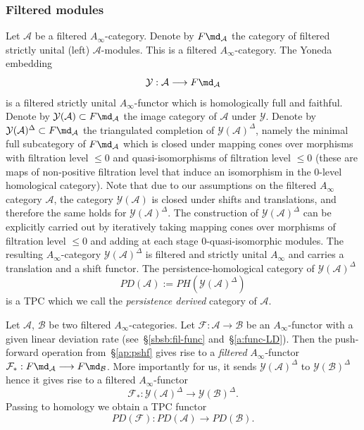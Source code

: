 \subsubsection{Filtered modules} \label{sbsb:fmod} Let
$\mathcal{A}$ be a filtered $A_{\infty}$-category. Denote by $F
\md_{\mathcal{A}}$ the category of filtered strictly unital (left)
$\mathcal{A}$-modules. This is a filtered 
$A_{\infty}$-category. The Yoneda embedding
$$\mathcal{Y}: \mathcal{A} \longrightarrow F\md_{\mathcal{A}}$$
is a filtered strictly unital $A_{\infty}$-functor which is
homologically full and faithful.  Denote by
$\mathcal{Y}(\mathcal{A}) \subset F \md_{\mathcal{A}}$ the image
category of $\mathcal{A}$ under $\mathcal{Y}$. Denote by
$\mathcal{Y}(\mathcal{A})^{\Delta} \subset F \md_{\mathcal{A}}$ the
triangulated completion of $\mathcal{Y}(\mathcal{A})^{\Delta}$,
namely the minimal full subcategory of $F \md_{\mathcal{A}}$ which is
closed under mapping cones over morphisms with filtration level
$\leq 0$ and quasi-isomorphisms of filtration level $\leq 0$
(these are maps of non-positive filtration level that induce an isomorphism in the $0$-level homological category). Note
that due to our assumptions on the filtered $A_{\infty}$ category $\mathcal{A}$, the category
$\mathcal{Y}(\mathcal{A})$ is closed under shifts and translations,
and therefore the same holds for $\mathcal{Y}(\mathcal{A})^{\Delta}$.
The construction of $\mathcal{Y}(\mathcal{A})^{\Delta}$ can be
explicitly carried out by iteratively taking mapping cones over
morphisms of filtration level $\leq 0$ and adding at each stage
$0$-quasi-isomorphic modules. The resulting
$A_{\infty}$-category $\mathcal{Y}(\mathcal{A})^{\Delta}$ is filtered
and strictly unital $A_{\infty}$ and carries a translation and a shift
functor. The persistence-homological category of
$\mathcal{Y}(\mathcal{A})^{\Delta}$
$$PD(\mathcal{A}) := PH(\mathcal{Y}(\mathcal{A})^{\Delta})$$
is a TPC which we call the {\em persistence derived} category of
$\mathcal{A}$.

Let $\mathcal{A}$, $\mathcal{B}$ be two filtered
$A_{\infty}$-categories. Let
  $\mathcal{F}: \mathcal{A} \longrightarrow \mathcal{B}$ be an
  $A_{\infty}$-functor with a given linear deviation rate
  (see~\S\ref{sbsb:fil-func} and~\S\ref{a:func-LD}). Then the
  push-forward operation from~\S\ref{ap:pshf} gives rise to a {\em
    filtered} $A_{\infty}$-functor
  $\mathcal{F}_*: F\md_{\mathcal{A}} \longrightarrow
  F\md_{\mathcal{B}}$.  More importantly for us, it sends
$\mathcal{Y}(\mathcal{A})^{\Delta}$ to
$\mathcal{Y}(\mathcal{\mathcal{B}})^{\Delta}$ hence it gives rise to a
filtered $A_{\infty}$-functor
$$\mathcal{F}_* : \mathcal{Y}(\mathcal{\mathcal{A}})^{\Delta}
\longrightarrow \mathcal{Y}(\mathcal{\mathcal{B}})^{\Delta}.$$ Passing
to homology we obtain a TPC functor
$$PD(\mathcal{F}): PD(\mathcal{A}) \longrightarrow PD(\mathcal{B}).$$

